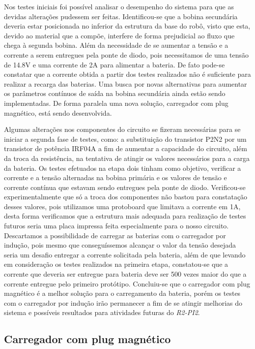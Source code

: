 Nos testes iniciais foi possível analisar o desempenho do sistema para que as devidas alterações pudessem ser feitas. 
Identificou-se que a bobina secundária deveria estar posicionada no inferior da estrutura da base do robô, visto que esta, devido ao material que a compõe, interfere de forma prejudicial ao fluxo que chega à segunda bobina. Além da necessidade de se aumentar a tensão e a corrente a serem entregues pela ponte de diodo, pois necessitamos de uma tensão de 14.8V e uma corrente de 2A para alimentar a bateria.
De fato pode-se constatar que a corrente obtida a partir dos testes realizados não é suficiente para realizar a recarga das baterias. Uma busca por novas alternativas para aumentar os parâmetros contínuos de saída na bobina secundária ainda estão sendo implementadas. De forma paralela uma nova solução, carregador com plug magnético, está sendo desenvolvida.

Algumas alterações nos componentes do circuito se fizeram necessárias para se iniciar a segunda fase de testes, como: a substituição do transistor P2N2 por um transistor de potência IRF04A a fim de aumentar a capacidade do circuito, além da troca da resistência, na tentativa de atingir os valores necessários para a carga da bateria.
Os testes efetuados na etapa dois tinham como objetivo, verificar a corrente e a tensão alternadas na bobina primária e os valores de tensão e corrente contínua que estavam sendo entregues pela ponte de diodo. Verificou-se experimentalmente que só a troca dos componentes não bastou para constatação desses valores, pois utilizamos uma protoboard que limitava a corrente em 1A, desta forma verificamos que a estrutura mais adequada para realização de testes futuros seria uma placa impressa feita especialmente para o nosso circuito.
Descartamos a possibilidade de carregar as baterias com o carregador por indução, pois mesmo que conseguíssemos alcançar o valor da tensão desejada seria um desafio entregar a corrente solicitada pela bateria, além de que levando em consideração os testes realizados na primeira etapa, constatou-se que a corrente que deveria ser entregue para bateria deve ser 500 vezes maior do que a corrente entregue pelo primeiro protótipo.
Concluiu-se que o carregador com plug magnético é a melhor solução para o carregamento da bateria, porém os testes com o carregador por indução irão permanecer a fim de se atingir melhorias do sistema e possíveis resultados para atividades futuras do \textit{R2-PI2}.

\subsection{Carregador com plug magnético}

